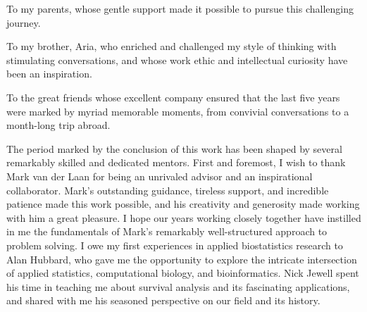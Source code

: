 \documentclass{ucbthesis}
\begin{document}


\maketitle
\copyrightpage



\begin{frontmatter}

\begin{dedication}
\null\vfil
\begin{center}
\vspace{12pt}

To my parents, whose gentle support made it possible to pursue this challenging
journey.

\vspace{22pt}

To my brother, Aria, who enriched and challenged my style of thinking with
stimulating conversations, and whose work ethic and intellectual curiosity have
been an inspiration.

\vspace{22pt}

To the great friends whose excellent company ensured that the last five years
were marked by myriad memorable moments, from convivial conversations to
a month-long trip abroad.

\end{center}
\vfil\null
\end{dedication}


\tableofcontents
\clearpage
\listoffigures
\clearpage
\listoftables

\begin{acknowledgements}

The period marked by the conclusion of this work has been shaped by several
remarkably skilled and dedicated mentors. First and foremost, I wish to thank
Mark van der Laan for being an unrivaled advisor and an inspirational
collaborator. Mark's outstanding guidance, tireless support, and incredible
patience made this work possible, and his creativity and generosity made working
with him a great pleasure. I hope our years working closely together have
instilled in me the fundamentals of Mark's remarkably well-structured approach
to problem solving. I owe my first experiences in applied biostatistics research
to Alan Hubbard, who gave me the opportunity to explore the intricate
intersection of applied statistics, computational biology, and bioinformatics.
Nick Jewell spent his time in teaching me about survival analysis and its
fascinating applications, and shared with me his seasoned perspective on our
field and its history.


\end{acknowledgements}
\end{frontmatter}
\end{document}
